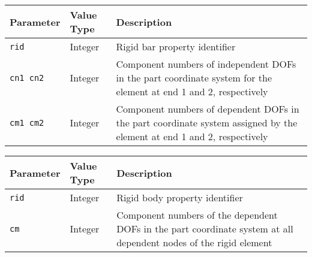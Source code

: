 \clearpage

\noindent
\begin{tabular}{| m{} | m{} | m{} |}
  \hline
  \rowcolor[HTML]{EFEFEF}
  Parameter & Value Type & Description \\
  \hline\hline
  {\tt rid} & Integer & Rigid bar property identifier \\
  \hline
  {\tt cn1 cn2} & Integer & Component numbers of independent DOFs in
                            the part coordinate system for the element
                            at end 1 and 2, respectively \\
  \hline
  {\tt cm1 cm2} & Integer & Component numbers of dependent DOFs in
                            the part coordinate system assigned by the element
                            at end 1 and 2, respectively \\
  \hline
\end{tabular}


\noindent
\begin{tabular}{| m{} | m{} | m{} |}
  \hline
  \rowcolor[HTML]{EFEFEF}
  Parameter & Value Type & Description \\
  \hline\hline
  {\tt rid} & Integer & Rigid body property identifier \\
  \hline
  {\tt cm}  & Integer & Component numbers of the dependent DOFs in
                        the part coordinate system at all dependent nodes of
                        the rigid element \\
  \hline
\end{tabular}


